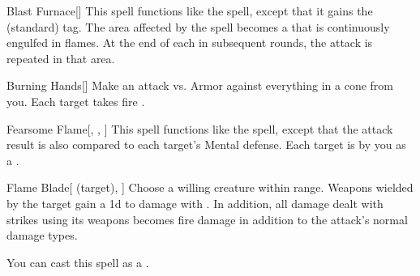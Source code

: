 \lowercase{\hypertarget{spell:Blast Furnace}{}}\label{spell:Blast Furnace}
\begin{apability}[\nth{2}]{\hypertarget{spell:Blast Furnace}{Blast Furnace}}[]
This spell functions like the  spell, except that it gains the  (standard) tag.
The area affected by the spell becomes a  that is continuously engulfed in flames.
At the end of each  in subsequent rounds, the attack is repeated in that area.
\end{apability}
\vspace{0.25em}



\lowercase{\hypertarget{spell:Burning Hands}{}}\label{spell:Burning Hands}
\begin{apability}[\nth{2}]{\hypertarget{spell:Burning Hands}{Burning Hands}}[]
Make an attack vs. Armor against everything in a \arealarge cone from you.
\hit Each target takes fire .
\end{apability}
\vspace{0.25em}



\lowercase{\hypertarget{spell:Fearsome Flame}{}}\label{spell:Fearsome Flame}
\begin{apability}[\nth{2}]{\hypertarget{spell:Fearsome Flame}{Fearsome Flame}}[, , ]
This spell functions like the  spell, except that the attack result is also compared to each target's Mental defense.
\hit Each target is  by you as a .
\end{apability}
\vspace{0.25em}



\lowercase{\hypertarget{spell:Flame Blade}{}}\label{spell:Flame Blade}
\begin{attuneability}[\nth{2}]{\hypertarget{spell:Flame Blade}{Flame Blade}}[ (target), ]
Choose a willing creature within \rngclose range.
Weapons wielded by the target gain a \plus1d  to damage with .
In addition, all damage dealt with strikes using its weapons becomes fire damage in addition to the attack's normal damage types.

You can cast this spell as a .
\end{attuneability}
\vspace{0.25em}



